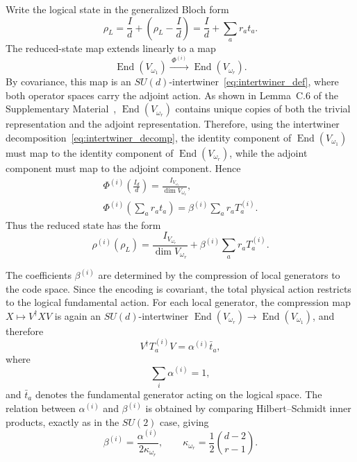 \documentclass[10pt,twocolumn,superscriptaddress,aps,amsmath,amssymb,citeautoscript,floatfix,prx,longbibliography]{revtex4-2}
\theoremstyle{plain}
\theoremstyle{plain}
\theoremstyle{plain}
\theoremstyle{plain}
\theoremstyle{plain}
\theoremstyle{plain}
\begin{document}
Write the logical state in the generalized Bloch form
\begin{equation}\label{eq:general_bloch}
\rho_L
=
\frac{I}{d}
+
\left(\rho_L-\frac{I}{d}\right)
=
\frac{I}{d}
+
\sum_a r_a t_a .
\end{equation}
The reduced-state map extends linearly to a map
$$
    \operatorname{End}(V_{\omega_1})
    \xrightarrow{\;\Phi^{(i)}\;}
    \operatorname{End}(V_{\omega_r}) .
$$
By covariance, this map is an $SU(d)$-intertwiner~\eqref{eq:intertwiner_def}, where both operator spaces carry the adjoint action. As shown in Lemma~C.6 of the Supplementary Material~\cite{SuppMat}, $\operatorname{End}(V_{\omega_r})$ contains unique copies of both the trivial representation and the adjoint representation. Therefore, using the intertwiner decomposition~\eqref{eq:intertwiner_decomp}, the identity component of $\operatorname{End}(V_{\omega_1})$ must map to the identity component of $\operatorname{End}(V_{\omega_r})$, while the adjoint component must map to the adjoint component. Hence
\begin{equation}\label{eq:linear_ext_of_red_state}
\begin{gathered}
\Phi^{(i)}\left(\frac{I_d}{d}\right)
=
\frac{I_{V_{\omega_r}}}{\dim V_{\omega_r}},
\\
\Phi^{(i)}\left(\sum_a r_a t_a\right)
=
\beta^{(i)}
\sum_a r_a T_a^{(i)} .
\end{gathered}
\end{equation}
Thus the reduced state has the form
\begin{equation}\label{eq:reduced_state_sud}
\rho^{(i)}(\rho_L)
=
\frac{I_{V_{\omega_r}}}{\dim V_{\omega_r}}
+
\beta^{(i)}
\sum_a r_a T_a^{(i)}.
\end{equation}

The coefficients $\beta^{(i)}$ are determined by the compression of local generators to the code space. Since the encoding is covariant, the total physical action restricts to the logical fundamental action. For each local generator, the compression map $X\mapsto V^\dagger X V$ is again an $SU(d)$-intertwiner $\operatorname{End}(V_{\omega_r})\rightarrow \operatorname{End}(V_{\omega_1})$, and therefore
$$
V^\dagger T_a^{(i)}V
=
\alpha^{(i)}\bar t_a ,
$$
where
$$
\sum_i\alpha^{(i)}=1,
$$
and $\bar t_a$ denotes the fundamental generator acting on the logical space. The relation between $\alpha^{(i)}$ and $\beta^{(i)}$ is obtained by comparing Hilbert--Schmidt inner products, exactly as in the $SU(2)$ case, giving
$$
\beta^{(i)}
=
\frac{\alpha^{(i)}}{2\kappa_{\omega_r}},
\qquad
\kappa_{\omega_r}
=
\frac12\binom{d-2}{r-1}.
$$
\end{document}
